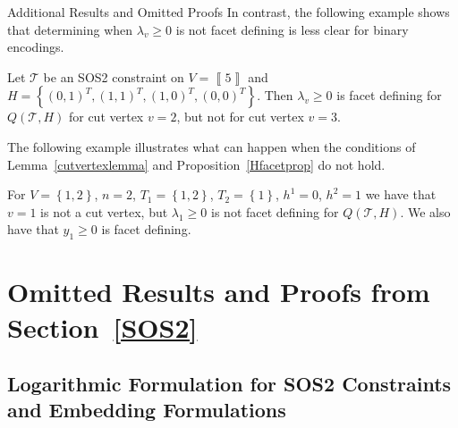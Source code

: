 \documentclass[mnsc]{informs3}
\newcommand{\set}[1]{\left\{#1\right\}}                     %
\newcommand{\bra}[1]{\left(#1\right)}
\newcommand{\sidx}[1]{\left\llbracket     #1 \right\rrbracket}
\begin{document}
\begin{APPENDIX}{Additional Results and Omitted Proofs}
In contrast, the following example shows that determining when  $\lambda_v\geq 0$ is not facet defining is less clear  for binary encodings. 
\begin{example} Let $\mathcal{T}$ be an SOS2 constraint on  $V=\sidx{5}$ and $H=\set{\bra{0,1}^T,\bra{1,1}^T,\bra{1,0}^T,\bra{0,0}^T}$. Then $\lambda_v\geq 0$ is facet defining for $Q\bra{\mathcal{T},H}$ for cut vertex $v=2$, but not for cut   vertex $v=3$.
\end{example}

The following example illustrates what can happen when the conditions of Lemma~\ref{cutvertexlemma} and Proposition~\ref{Hfacetprop} do not hold. 
\begin{example}\label{boundsexample} For $V=\set{1,2}$, $n=2$, $T_1=\set{1,2}$, $T_2=\set{1}$, $h^1=0$, $h^2=1$ we have that $v=1$ is not a cut vertex, but $\lambda_1\geq 0$ is not facet defining for $Q\bra{\mathcal{T},H}$. We also have that $y_1\geq 0$ is facet defining.
\end{example}






\section{Omitted Results and Proofs from Section~\ref{SOS2}}

\subsection{Logarithmic Formulation for SOS2 Constraints and Embedding Formulations}\label{logsos2emsec}


\end{APPENDIX}
\end{document}
